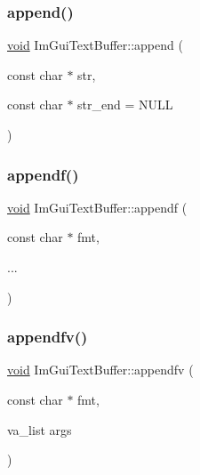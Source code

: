 \subsubsection{\texorpdfstring{append()}{append()}}
{\footnotesize\ttfamily \hyperlink{imgui__impl__opengl3__loader_8h_ac668e7cffd9e2e9cfee428b9b2f34fa7}{void} Im\+Gui\+Text\+Buffer\+::append (\begin{DoxyParamCaption}\item[{const char $\ast$}]{str,  }\item[{const char $\ast$}]{str\+\_\+end = {\ttfamily NULL} }\end{DoxyParamCaption})}

\mbox{\label{structImGuiTextBuffer_a1c5892db030c5364823793f472754c9e}} 
\subsubsection{\texorpdfstring{appendf()}{appendf()}}
{\footnotesize\ttfamily \hyperlink{imgui__impl__opengl3__loader_8h_ac668e7cffd9e2e9cfee428b9b2f34fa7}{void} Im\+Gui\+Text\+Buffer\+::appendf (\begin{DoxyParamCaption}\item[{const char $\ast$}]{fmt,  }\item[{}]{... }\end{DoxyParamCaption})}

\mbox{\label{structImGuiTextBuffer_ac8a6b11834c4cee8113bf6950e66112e}} 
\subsubsection{\texorpdfstring{appendfv()}{appendfv()}}
{\footnotesize\ttfamily \hyperlink{imgui__impl__opengl3__loader_8h_ac668e7cffd9e2e9cfee428b9b2f34fa7}{void} Im\+Gui\+Text\+Buffer\+::appendfv (\begin{DoxyParamCaption}\item[{const char $\ast$}]{fmt,  }\item[{va\+\_\+list}]{args }\end{DoxyParamCaption})}

\mbox{\label{structImGuiTextBuffer_aab6d83c6b9a8061287a4cb6135c1cab4}} 
